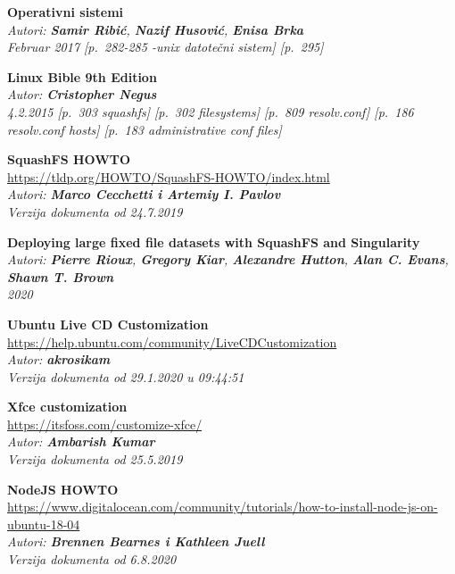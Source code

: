 \documentclass[12pt,vi]{mitthesis}
\begin{document}
\renewcommand*\bibname{Reference}
\begin{thebibliography}{38}

\textbf{Operativni sistemi}\\
\textit{Autori: \textbf{Samir Ribić}, \textbf{Nazif Husović}, \textbf{Enisa Brka}}\\
\textit{Februar 2017 [p.~282-285 -unix datotečni sistem] [p.~295]}

\textbf{Linux Bible 9th Edition}\\
\textit{Autor: \textbf{Cristopher Negus}}\\
\textit{4.2.2015 [p.~303 squashfs] [p.~302 filesystems] [p.~809 resolv.conf] [p.~186 resolv.conf hosts] [p.~183 administrative conf files]}

\textbf{SquashFS HOWTO}\\
\url{https://tldp.org/HOWTO/SquashFS-HOWTO/index.html}\\
\textit{Autori: \textbf{Marco Cecchetti i Artemiy I. Pavlov}}\\
\textit{Verzija dokumenta od 24.7.2019}

\textbf{Deploying large fixed file datasets with SquashFS and Singularity}\\
\textit{Autori: \textbf{Pierre Rioux}, \textbf{Gregory Kiar}, \textbf{Alexandre Hutton}, \textbf{Alan C. Evans}, \textbf{Shawn T. Brown}}\\
\textit{2020}

\textbf{Ubuntu Live CD Customization}\\
\url{https://help.ubuntu.com/community/LiveCDCustomization}\\
\textit{Autor: \textbf{akrosikam}}\\
\textit{Verzija dokumenta od 29.1.2020 u 09:44:51}

\textbf{Xfce customization}\\
\url{https://itsfoss.com/customize-xfce/}\\
\textit{Autor: \textbf{Ambarish Kumar}}\\
\textit{Verzija dokumenta od 25.5.2019}

\textbf{NodeJS HOWTO}\\
\url{https://www.digitalocean.com/community/tutorials/how-to-install-node-js-on-ubuntu-18-04}\\
\textit{Autori: \textbf{Brennen Bearnes i Kathleen Juell}}\\
\textit{Verzija dokumenta od 6.8.2020}


\end{thebibliography}
\end{document}
